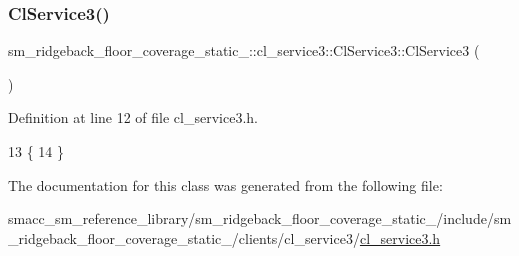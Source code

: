 \subsubsection{\texorpdfstring{Cl\+Service3()}{ClService3()}}
{\footnotesize\ttfamily sm\+\_\+ridgeback\+\_\+floor\+\_\+coverage\+\_\+static\+\_\+::cl\+\_\+service3\+::\+Cl\+Service3\+::\+Cl\+Service3 (\begin{DoxyParamCaption}{ }\end{DoxyParamCaption})\hspace{0.3cm}{\ttfamily [inline]}}



Definition at line 12 of file cl\+\_\+service3.\+h.


\begin{DoxyCode}
13   \{
14   \}
\end{DoxyCode}


The documentation for this class was generated from the following file\+:\begin{DoxyCompactItemize}
\item 
smacc\+\_\+sm\+\_\+reference\+\_\+library/sm\+\_\+ridgeback\+\_\+floor\+\_\+coverage\+\_\+static\+\_/include/sm\+\_\+ridgeback\+\_\+floor\+\_\+coverage\+\_\+static\+\_/clients/cl\+\_\+service3/\hyperlink{sm__ridgeback__floor__coverage__static__1_2include_2sm__ridgeback__floor__coverage__static__1_2c066aef07bbb3d025e7abbf56aee71210}{cl\+\_\+service3.\+h}\end{DoxyCompactItemize}
